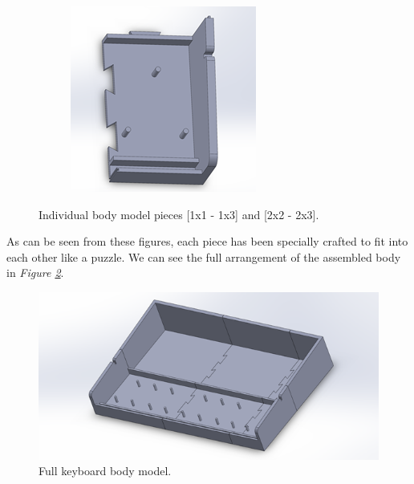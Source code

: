 \begin{figure}[h!]
\begin{subfigure}[b]{0.45\textwidth}
    \centering
    \includegraphics[width=\textwidth]{image/BodyModel8.png}
  \end{subfigure}
  \caption{Individual body model pieces [1x1 - 1x3] and [2x2 - 2x3].}
  \label{fig:body_parts}
\end{figure}

As can be seen from these figures, each piece has been specially crafted to fit into each other like a puzzle. We can see the full arrangement of the assembled body in \textit{Figure \ref{fig:assembled_body}}.

\begin{figure}[h!]
  \centering
  \includegraphics[width=0.9\linewidth]{image/AssembledBody.png}
  \caption{Full keyboard body model.}
  \label{fig:assembled_body}
\end{figure}

